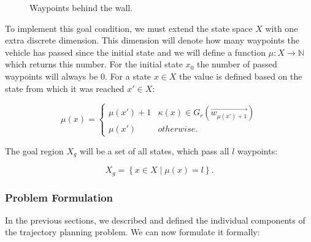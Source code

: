 \begin{figure}
	\centering
	\caption{Waypoints behind the wall.}
	\label{fig:waypoints}
\end{figure}

To implement this goal condition, we must extend the state space $X$ with one extra discrete dimension. This dimension will denote how many waypoints the vehicle has passed since the initial state and we will define a function $\mu: X\rightarrow \mathbb{N}$ which returns this number. For the initial state $x_0$ the number of passed waypoints will always be 0. For a state $x\in X$ the value is defined based on the state from which it was reached $x'\in X$: 

\begin{equation*}
	\mu(x)=
	\begin{cases}
		\mu(x')+1 & \kappa(x)\in G_r(\vec{w_{\mu(x')+1}}) \\
		\mu(x') & otherwise.
	\end{cases}
\end{equation*}

The goal region $X_g$ will be a set of all states, which pass all $l$ waypoints:

\[
	X_g=\left\{x\in X \mid \mu(x)=l\right\}.
\]

\subsubsection{Problem Formulation}

In the previous sections, we described and defined the individual components of the trajectory planning problem. We can now formulate it formally:

